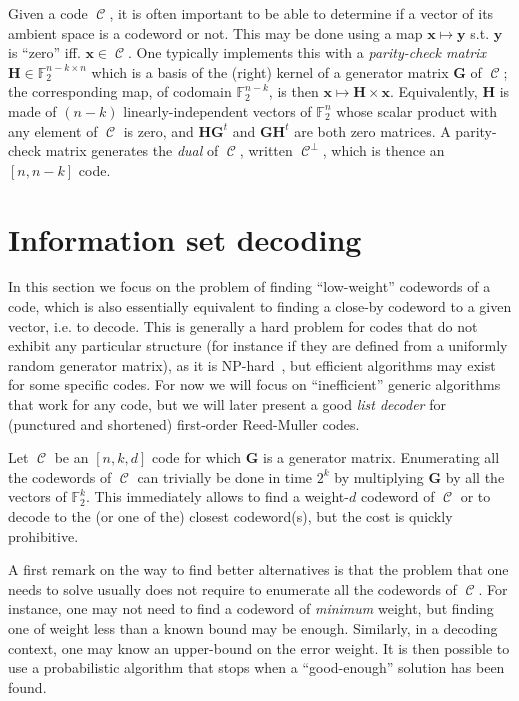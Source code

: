 \documentclass[11pt,a4paper]{article}
\theoremstyle{definition}
\DeclareMathOperator\code{\mathcal{C}}
\newcommand\ftwo{\mathbb{F}_{2}}
\begin{document}
\medskip

Given a code $\code$, it is often important to be able to determine if a vector of its ambient space is a codeword or not.
This may be done using a map $\bm{x} \mapsto \bm{y}$ s.t. $\bm{y}$ is ``zero'' iff. $\bm{x} \in \code$. One typically implements this with a \emph{parity-check matrix} $\bm{H} \in \ftwo^{n-k\times n}$
which is a basis of the (right) kernel of a generator matrix $\bm{G}$ of $\code$; the corresponding map, of codomain $\ftwo^{n-k}$, is then $\bm{x} \mapsto \bm{H}\times\bm{x}$. Equivalently, $\bm{H}$ is made of $(n-k)$ linearly-independent vectors of $\ftwo^n$ whose scalar product with any element of $\code$ is zero, and $\bm{H}\bm{G}^t$ and
$\bm{G}\bm{H}^t$ are both zero matrices. A parity-check matrix generates the \emph{dual} of $\code$, written $\code^\bot$, which is thence an $[n,n-k]$ code.

\section{Information set decoding}

In this section we focus on the problem of finding ``low-weight'' codewords of  a code, which is also essentially equivalent to finding a close-by codeword to a given vector, i.e. to decode.
This is generally a hard problem for codes that do not exhibit any particular structure (for instance if they are defined from a uniformly random generator matrix), as it is NP-hard~\cite{codeshard}, but efficient algorithms may exist for some specific codes. For now we will focus on
``inefficient'' generic algorithms that work for any code, but we will later present a good \emph{list decoder} for (punctured and shortened) first-order Reed-Muller codes.

\smallskip

Let $\code$ be an $[n,k,d]$ code for which $\bm{G}$ is a generator matrix. Enumerating all the codewords of $\code$ can trivially be done in time $2^k$ by multiplying $\bm{G}$ by all the vectors of $\ftwo^k$. This immediately allows to find
a weight-$d$ codeword of $\code$ or to decode to the (or one of the) closest codeword(s),
but the cost is quickly prohibitive.

A first remark on the way to find better alternatives is that the problem that one needs to solve usually does not require to enumerate all the codewords of $\code$. For instance, one may not need to find a codeword of \emph{minimum} weight,
but finding one of weight less than a known bound may be enough. Similarly, in a decoding context, one may know an upper-bound on the error weight. It is then possible to use a probabilistic algorithm that stops when a ``good-enough''
solution has been found.
\end{document}
